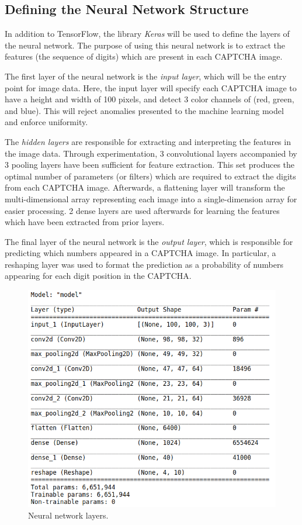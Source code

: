 \documentclass[11pt,conference]{IEEEtran}
\begin{document}
\subsection{Defining the Neural Network Structure}
In addition to TensorFlow, the library \emph{Keras} will be used to define the
layers of the neural network. The purpose of using this neural network is to extract the features
(the sequence of digits) which are present in each CAPTCHA image.

The first layer of the neural network is the \emph{input layer}, which will be
the entry point for image data. Here, the input layer will specify each CAPTCHA image
to have a height and width of 100 pixels, and detect 3 color channels of
(red, green, and blue). This will reject anomalies presented to the machine
learning model and enforce uniformity.

The \emph{hidden layers} are responsible for extracting and interpreting the
features in the image data. Through experimentation, 3
convolutional layers accompanied by 3 pooling layers have been sufficient 
for feature extraction. This set produces the optimal number of parameters (or
filters) which are required to extract the digits from each CAPTCHA image.
Afterwards, a flattening layer will transform the multi-dimensional array
representing each image into a single-dimension array for
easier processing. 2 dense layers are used afterwards for learning the features
which have been extracted from prior layers. 

The final layer of the neural network is the \emph{output layer}, which is
responsible for predicting which numbers appeared in a CAPTCHA image. In
particular, a reshaping layer was used to format the prediction as a
probability of numbers appearing for each digit position in the CAPTCHA.

\begin{figure}[htbp]
	\centerline{\includegraphics[scale=0.28]{images/model-summary.png}}
	\caption{Neural network layers.}
	\label{figure}
\end{figure}
\end{document}

